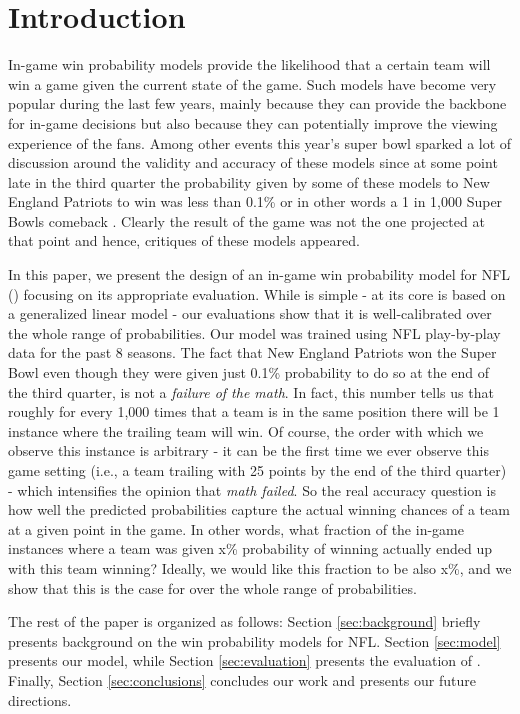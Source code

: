 \section{Introduction}
\label{sec:intro}

In-game win probability models provide the likelihood that a certain team will win a game given the current state of the game.  
Such models have become very popular during the last few years, mainly because they can provide the backbone for in-game decisions but also because they can potentially improve the viewing experience of the fans.  
Among other events this year's super bowl sparked a lot of discussion around the validity and accuracy of these models \cite{ringer17} since at some point late in the third quarter the probability given by some of these models to New England Patriots to win was less than 0.1\% or in other words a 1 in 1,000 Super Bowls comeback \cite{statsbylopez}.  
Clearly the result of the game was not the one projected at that point and hence, critiques of these models appeared.  

In this paper, we present the design of an in-game win probability model for NFL ({\method}) focusing on its appropriate evaluation.  
While {\method} is simple - at its core is based on a generalized linear model - our evaluations show that it is well-calibrated over the whole range of probabilities.  
Our model was trained using NFL play-by-play data for the past 8 seasons.  
The fact that New England Patriots won the Super Bowl even though they were given just 0.1\% probability to do so at the end of the third quarter, is not a {\em failure of the math}.  
In fact, this number tells us that roughly for every 1,000 times that a team is in the same position there will be 1 instance where the trailing team will win.  
Of course, the order with which we observe this instance is arbitrary - it can be the first time we ever observe this game setting (i.e., a team trailing with 25 points by the end of the third quarter) - which intensifies the opinion that {\em math failed}. 
So the real accuracy question is how well the predicted probabilities capture the actual winning chances of a team at a given point in the game.  
In other words, what fraction of the in-game instances where a team was given x\% probability of winning actually ended up with this team winning?  
Ideally, we would like this fraction to be also x\%, and we show that this is the case for {\method} over the whole range of probabilities. 

The rest of the paper is organized as follows: 
Section \ref{sec:background} briefly presents background on the win probability models for NFL.  
Section \ref{sec:model} presents our model, while Section \ref{sec:evaluation} presents the evaluation of {\method}.  
Finally, Section \ref{sec:conclusions} concludes our work and presents our future directions. 

